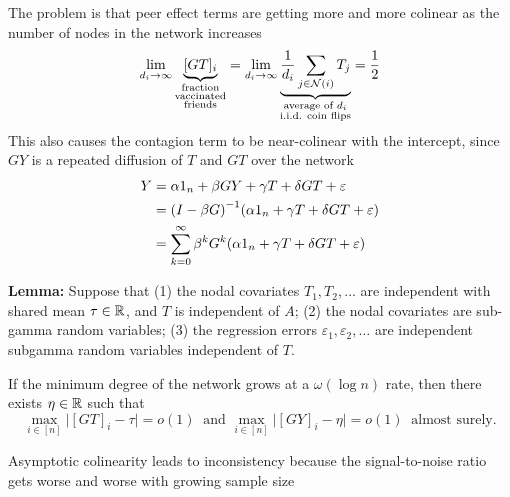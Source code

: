 \documentclass[final]{beamer}
\newlength{\colwidth}
\begin{document}
\begin{frame}[t]
\begin{columns}[t]
\begin{column}{\colwidth}
\begin{block}{The problem is that peer effect terms are getting more and more colinear as the number of nodes in the network increases}
                \begin{equation} \label{eq:avg}
                    \lim_{d_i \to \infty}
                    \underbrace{[GT]_i}_{\substack{\text{fraction} \\ \text{vaccinated} \\ \text{friends}}}
                    =
                    \lim_{d_i \to \infty}
                    \underbrace{
                        \frac{1}{d_i} \sum_{j \in \mathcal N(i)} T_j
                    }_{\substack{\text{average of $d_i$}           \\ \text{i.i.d. coin flips}}}
                    = \frac 12
                \end{equation}
                This also causes the contagion term to be near-colinear with the intercept, since $GY$ is a repeated diffusion of $T$ and $GT$ over the network
                \begin{align*}
                    Y & = \alpha 1_n + \beta G Y + \gamma T + \delta G T + \varepsilon                            \\
                      & = \paren*{I - \beta G}^{-1} \paren*{\alpha 1_n + \gamma T + \delta G T + \varepsilon}     \\
                      & = \sum_{k=0}^\infty \beta^k G^k \paren*{\alpha 1_n + \gamma T + \delta G T + \varepsilon}
                \end{align*}

                \textbf{Lemma:} Suppose that (1) the nodal covariates $T_1, T_2, \dots$ are independent with shared mean $\tau \in \mathbb{R}$, and $T$ is independent of $A$; (2) the nodal covariates are sub-gamma random variables; (3) the regression errors $\varepsilon_1, \varepsilon_2, \dots$ are independent subgamma random variables independent of $T$.

                If the minimum degree of the network grows at a $\omega(\log n)$ rate, then there exists $\eta \in \mathbb{R}$ such that
                \begin{equation*}
                    \max_{i \in [n]} \Big| [GT]_i - \tau \Big|
                    = o(1) ~ \text{ and }
                    \max_{i \in [n]} \Big| [GY]_i - \eta \Big| = o(1)~ \text{ almost surely.}
                \end{equation*}
            \end{block}

            \begin{block}{Asymptotic colinearity leads to inconsistency because the signal-to-noise ratio gets worse and worse with growing sample size}


\end{block}
\end{column}
\end{columns}
\end{frame}
\end{document}
